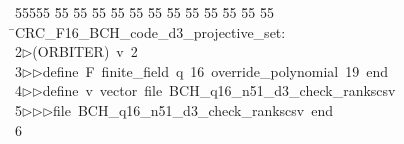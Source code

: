%
%
\begin{tabbing}
55555 \= 55 \= 55 \= 55 \= 55 \= 55 \= 55 \= 55 \= 55 \= 55 \= 55 \= 55 \= 55 \= \>CRC\_F16\_BCH\_code\_d3\_projective\_set:\\[0pt]
2\>$\triangleright$\>(ORBITER)\ v\ 2\ \\[0pt]
3\>$\triangleright$\>$\triangleright$\>define\ F\ finite\_field\ q\ 16\ override\_polynomial\ 19\ end\ \\[0pt]
4\>$\triangleright$\>$\triangleright$\>define\ v\ vector\ file\ BCH\_q16\_n51\_d3\_check\_rankscsv\ \\[0pt]
5\>$\triangleright$\>$\triangleright$\>$\triangleright$\>file\ BCH\_q16\_n51\_d3\_check\_rankscsv\ end\ \\[0pt]
6\>\end{tabbing}
